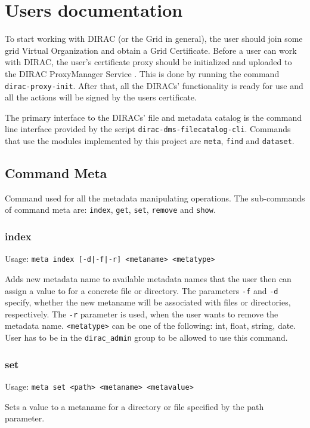 \chapter{Users documentation}
\label{chap:user}

To start working with DIRAC 
(or the Grid in general), the user should join some 
grid Virtual Organization and obtain a Grid Certificate. 
Before a user can work with DIRAC, the user’s certificate proxy 
should be initialized and uploaded to the DIRAC ProxyManager Service \cite{DISET}.
This is done by running the command \texttt{dirac-proxy-init}. After that,
all the DIRACs' functionality is ready for use and all the actions will
be signed by the users certificate.

The primary interface to the DIRACs' file and metadata catalog
is the command line interface provided by the script
\texttt{dirac-dms-filecatalog-cli}. Commands that use the modules 
implemented by this project are \texttt{meta}, \texttt{find} 
and \texttt{dataset}.

\section{Command Meta}
Command used for all the metadata manipulating operations.
The sub-commands of command meta are: \texttt{index}, \texttt{get},
\texttt{set}, \texttt{remove} and \texttt{show}.

\subsection{index}
Usage: \texttt{meta index [-d|-f|-r] <metaname> <metatype>}

Adds new metadata name to available metadata names
that the user then can assign a value to for a concrete file
or directory. The parameters \texttt{-f} and \texttt{-d} specify,
whether the new metaname will be associated with files or directories,
respectively. The \texttt{-r} parameter is used, when the user
wants to remove the metadata name. \texttt{<metatype>} can be
one of the following: int, float, string, date. User has to be
in the \texttt{dirac\_admin} group to be allowed to use this
command.

\subsection{set}
Usage: \texttt{meta set <path> <metaname> <metavalue>}

Sets a value to a metaname for a directory or file specified by
the path parameter. 

